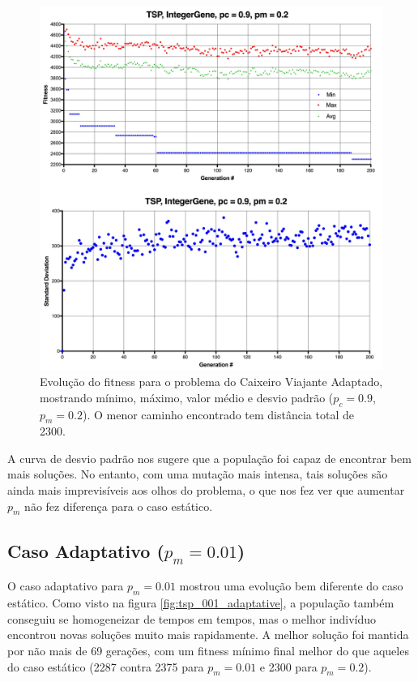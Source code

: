 \begin{figure}[ht!]
    \centering \includegraphics[width=1.0\textwidth]{tsp_02.jpg}
    \caption{Evolução do fitness para o problema do Caixeiro Viajante Adaptado, mostrando mínimo, máximo, valor médio e desvio padrão ($p_c=0.9$, $p_m=0.2$). O menor caminho encontrado tem distância total de 2300.}
    \label{fig:tsp02}
\end{figure}

A curva de desvio padrão nos sugere que a população foi capaz de encontrar bem mais soluções. No entanto, com uma mutação mais intensa, tais soluções são ainda mais imprevisíveis aos olhos do problema, o que nos fez ver que aumentar $p_m$ não fez diferença para o caso estático.

\subsection{Caso Adaptativo ($p_m = 0.01$)}

O caso adaptativo para $p_m = 0.01$ mostrou uma evolução bem diferente do caso estático. Como visto na figura \ref{fig:tsp_001_adaptative}, a população também conseguiu se homogeneizar de tempos em tempos, mas o melhor indivíduo encontrou novas soluções muito mais rapidamente. A melhor solução foi mantida por não mais de 69 gerações, com um fitness mínimo final melhor do que aqueles do caso estático (2287 contra 2375 para $p_m = 0.01$ e 2300 para $p_m = 0.2$).

